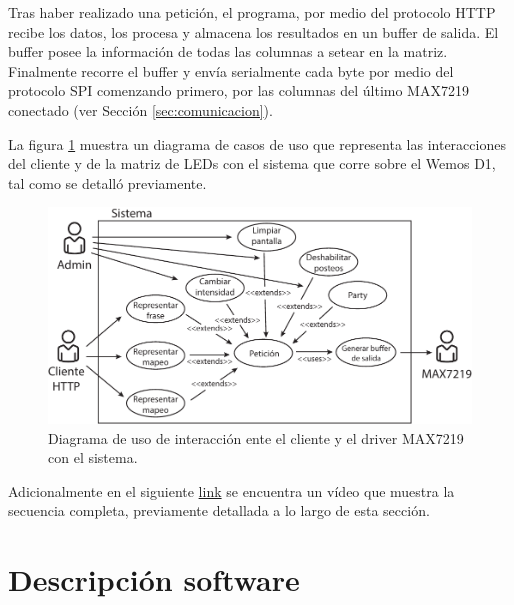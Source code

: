     Tras haber realizado una petición, el programa, por medio del protocolo HTTP recibe los datos, los procesa y almacena los resultados en un buffer de salida. El buffer posee la información de todas las columnas a setear en la matriz. Finalmente recorre el buffer y envía serialmente cada byte por medio del protocolo SPI comenzando primero, por las columnas del último MAX7219 conectado (ver Sección \ref{sec:comunicacion}).

    La figura \ref{fig:diagrama-casos-uso} muestra un diagrama de casos de uso que representa las interacciones del cliente y de la matriz de LEDs con el sistema que corre sobre el Wemos D1, tal como se detalló previamente.

    \begin{figure}[ht!]
        \centering
        \begin{center}
            \includegraphics[width=\textwidth]{imagenes/sistema-caso-de-uso.pdf}
            \caption{Diagrama de uso de interacción ente el cliente y el driver MAX7219 con el sistema.}
            \label{fig:diagrama-casos-uso}
        \end{center}
    \end{figure}
    
    Adicionalmente en el siguiente \href{https://youtu.be/9Y2iGTpO6-U}{link} se encuentra un vídeo que muestra la secuencia completa, previamente detallada a lo largo de esta sección.




\section{Descripción software}

